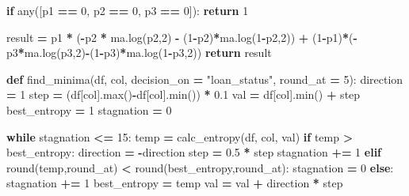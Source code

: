 \documentclass[
]{book}
\newenvironment{Shaded}{\begin{snugshade}}{\end{snugshade}}
\newcommand{\BuiltInTok}[1]{#1}
\newcommand{\ControlFlowTok}[1]{\textcolor[rgb]{0.13,0.29,0.53}{\textbf{#1}}}
\newcommand{\DecValTok}[1]{\textcolor[rgb]{0.00,0.00,0.81}{#1}}
\newcommand{\FloatTok}[1]{\textcolor[rgb]{0.00,0.00,0.81}{#1}}
\newcommand{\KeywordTok}[1]{\textcolor[rgb]{0.13,0.29,0.53}{\textbf{#1}}}
\newcommand{\NormalTok}[1]{#1}
\newcommand{\OperatorTok}[1]{\textcolor[rgb]{0.81,0.36,0.00}{\textbf{#1}}}
\newcommand{\StringTok}[1]{\textcolor[rgb]{0.31,0.60,0.02}{#1}}
\begin{document}
\begin{Shaded}
\begin{Highlighting}[]
  \ControlFlowTok{if} \BuiltInTok{any}\NormalTok{([p1 }\OperatorTok{==} \DecValTok{0}\NormalTok{, p2 }\OperatorTok{==} \DecValTok{0}\NormalTok{, p3 }\OperatorTok{==} \DecValTok{0}\NormalTok{]):}
    \ControlFlowTok{return} \DecValTok{1}
  
\NormalTok{  result }\OperatorTok{=}\NormalTok{ p1 }\OperatorTok{*}\NormalTok{ (}\OperatorTok{{-}}\NormalTok{p2 }\OperatorTok{*}\NormalTok{ ma.log(p2,}\DecValTok{2}\NormalTok{) }\OperatorTok{{-}}\NormalTok{ (}\DecValTok{1}\OperatorTok{{-}}\NormalTok{p2)}\OperatorTok{*}\NormalTok{ma.log(}\DecValTok{1}\OperatorTok{{-}}\NormalTok{p2,}\DecValTok{2}\NormalTok{)) }\OperatorTok{+}\NormalTok{ (}\DecValTok{1}\OperatorTok{{-}}\NormalTok{p1)}\OperatorTok{*}\NormalTok{(}\OperatorTok{{-}}\NormalTok{p3}\OperatorTok{*}\NormalTok{ma.log(p3,}\DecValTok{2}\NormalTok{)}\OperatorTok{{-}}\NormalTok{(}\DecValTok{1}\OperatorTok{{-}}\NormalTok{p3)}\OperatorTok{*}\NormalTok{ma.log(}\DecValTok{1}\OperatorTok{{-}}\NormalTok{p3,}\DecValTok{2}\NormalTok{))}
  \ControlFlowTok{return}\NormalTok{ result}

\KeywordTok{def}\NormalTok{ find\_minima(df, col, decision\_on }\OperatorTok{=} \StringTok{"loan\_status"}\NormalTok{, round\_at }\OperatorTok{=} \DecValTok{5}\NormalTok{):}
\NormalTok{  direction }\OperatorTok{=} \DecValTok{1}
\NormalTok{  step }\OperatorTok{=}\NormalTok{ (df[col].}\BuiltInTok{max}\NormalTok{()}\OperatorTok{{-}}\NormalTok{df[col].}\BuiltInTok{min}\NormalTok{()) }\OperatorTok{*} \FloatTok{0.1}
\NormalTok{  val }\OperatorTok{=}\NormalTok{ df[col].}\BuiltInTok{min}\NormalTok{() }\OperatorTok{+}\NormalTok{ step}
\NormalTok{  best\_entropy }\OperatorTok{=} \DecValTok{1}
\NormalTok{  stagnation }\OperatorTok{=} \DecValTok{0}
  
  \ControlFlowTok{while}\NormalTok{ stagnation }\OperatorTok{\textless{}=} \DecValTok{15}\NormalTok{:}
\NormalTok{    temp }\OperatorTok{=}\NormalTok{ calc\_entropy(df, col, val)}
    \ControlFlowTok{if}\NormalTok{ temp }\OperatorTok{\textgreater{}}\NormalTok{ best\_entropy:}
\NormalTok{      direction }\OperatorTok{=} \OperatorTok{{-}}\NormalTok{direction}
\NormalTok{      step }\OperatorTok{=} \FloatTok{0.5} \OperatorTok{*}\NormalTok{ step}
\NormalTok{      stagnation }\OperatorTok{+=} \DecValTok{1}
    \ControlFlowTok{elif} \BuiltInTok{round}\NormalTok{(temp,round\_at) }\OperatorTok{\textless{}} \BuiltInTok{round}\NormalTok{(best\_entropy,round\_at):}
\NormalTok{      stagnation }\OperatorTok{=} \DecValTok{0}
    \ControlFlowTok{else}\NormalTok{:}
\NormalTok{      stagnation }\OperatorTok{+=} \DecValTok{1}
\NormalTok{    best\_entropy }\OperatorTok{=}\NormalTok{ temp}
\NormalTok{    val }\OperatorTok{=}\NormalTok{ val }\OperatorTok{+}\NormalTok{ direction }\OperatorTok{*}\NormalTok{ step}
    

\end{Highlighting}
\end{Shaded}
\end{document}
